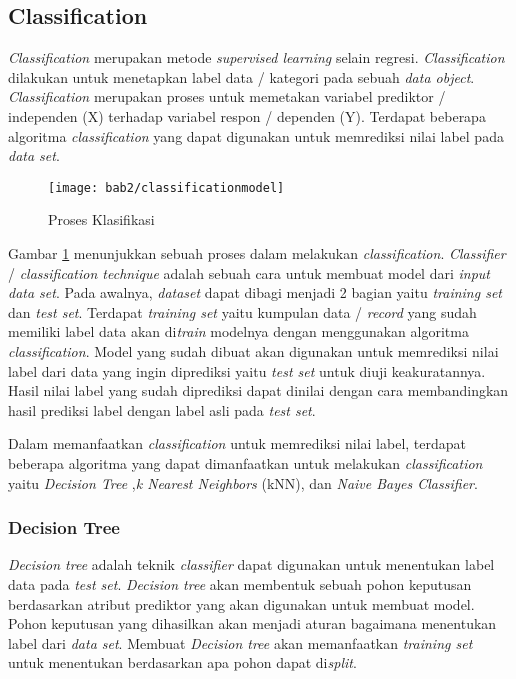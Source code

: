 	
\subsection{Classification}
\textit{Classification} merupakan metode \textit{supervised learning} selain regresi. \textit{Classification} dilakukan untuk menetapkan label data / kategori pada sebuah \textit{data object}. \textit{Classification} merupakan proses untuk memetakan variabel prediktor / independen (X) terhadap variabel respon / dependen (Y). Terdapat beberapa algoritma \textit{classification} yang dapat digunakan untuk memrediksi nilai label pada \textit{data set}. 
\pagebreak

\begin{figure}[h!]
	\centering  
	\texttt{[image: bab2/classificationmodel]}  
	\caption{Proses Klasifikasi} 
	\label{fig:classificationprocess}
\end{figure} 

Gambar \ref{fig:classificationprocess} menunjukkan sebuah proses dalam melakukan \textit{classification}. \textit{Classifier} / \textit{classification technique} adalah sebuah cara untuk membuat model dari \textit{input data set}. Pada awalnya, \textit{dataset} dapat dibagi menjadi 2 bagian yaitu \textit{training set} dan \textit{test set}. Terdapat \textit{training set} yaitu kumpulan data / \textit{record} yang sudah memiliki label data akan di\textit{train} modelnya dengan menggunakan algoritma \textit{classification}. Model yang sudah dibuat akan digunakan untuk memrediksi nilai label dari data yang ingin diprediksi yaitu \textit{test set} untuk diuji keakuratannya. Hasil nilai label yang sudah diprediksi dapat dinilai dengan cara membandingkan hasil prediksi label dengan label asli pada \textit{test set}.


Dalam memanfaatkan \textit{classification} untuk memrediksi nilai label, terdapat beberapa algoritma yang dapat dimanfaatkan untuk melakukan \textit{classification} yaitu \textit{Decision Tree} ,\textit{k Nearest Neighbors} (kNN), dan \textit{Naive Bayes Classifier}.

\subsubsection{Decision Tree} 
\textit{Decision tree} adalah teknik \textit{classifier} dapat digunakan untuk menentukan label data pada \textit{test set}. \textit{Decision tree} akan membentuk sebuah pohon keputusan berdasarkan atribut prediktor yang akan digunakan untuk membuat model. Pohon keputusan yang dihasilkan akan menjadi aturan bagaimana menentukan label dari \textit{data set}. Membuat \textit{Decision tree} akan memanfaatkan \textit{training set} untuk menentukan berdasarkan apa pohon dapat di\textit{split}. 

